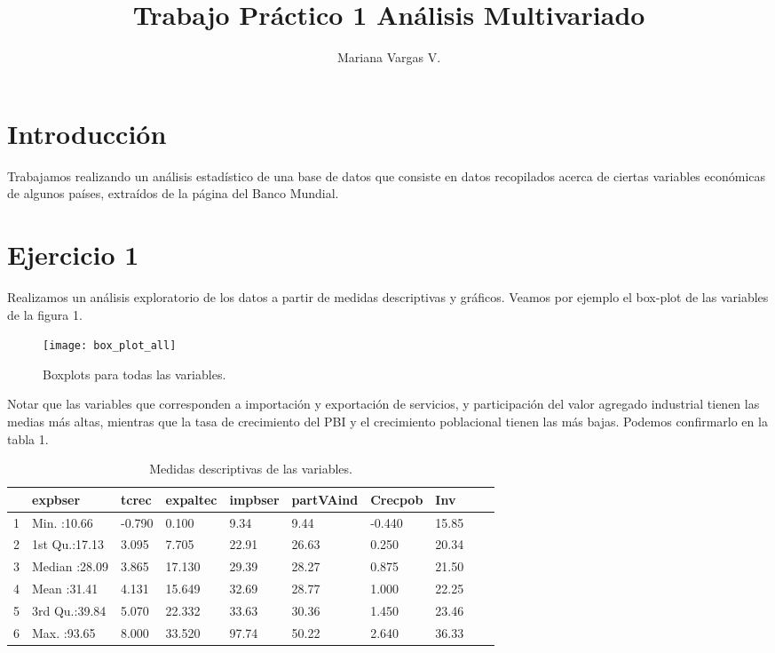 \documentclass[a4paper,10pt]{article}
\title{Trabajo Práctico 1 Análisis Multivariado}
\author{Mariana Vargas V.}
\begin{document}
\maketitle

\section{Introducción}

Trabajamos realizando un análisis estadístico de una base de datos que consiste en datos recopilados acerca
de ciertas variables económicas de algunos países, extraídos de la página del Banco Mundial.

\section{Ejercicio 1}

Realizamos un análisis exploratorio de los datos a partir de medidas descriptivas y gráficos. Veamos por ejemplo el box-plot de las variables de la
figura 1.

\begin{figure}[h]
\centering
\texttt{[image: box\_plot\_all]}
\caption{Boxplots para todas las variables.}
\end{figure}

Notar que las variables que corresponden a importación y exportación de servicios, y participación del valor agregado industrial tienen las medias más
altas, mientras que la tasa de crecimiento del PBI y el crecimiento poblacional tienen las más bajas. Podemos confirmarlo en la tabla 1.

\begin{table}[ht]
\centering
\begin{tabular}{rlllllllll}
  \hline
 &    expbser &     tcrec &    expaltec &    impbser &   partVAind &    Crecpob &      Inv & \\ 
  \hline
1 &Min.   :10.66   & -0.790   &  0.100   &  9.34   &  9.44   & -0.440   &  15.85 \\ 
  2 & 1st Qu.:17.13   &3.095   &  7.705   & 22.91   & 26.63   &  0.250   & 20.34  \\ 
  3 & Median :28.09   &3.865   & 17.130   & 29.39   & 28.27   &  0.875   & 21.50  \\ 
  4  & Mean   :31.41   &4.131   & 15.649   & 32.69   & 28.77   &  1.000   & 22.25  \\ 
  5 & 3rd Qu.:39.84   & 5.070   & 22.332   & 33.63   & 30.36   &  1.450   & 23.46  \\ 
  6 & Max.   :93.65   &8.000   &33.520   &97.74   &50.22   & 2.640   &36.33 \\ 
   \hline
\end{tabular}
\caption{Medidas descriptivas de las variables.}
\end{table}
\end{document}
